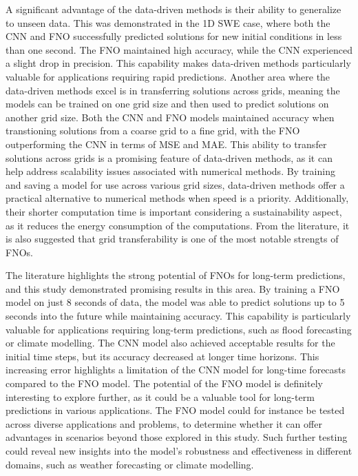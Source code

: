 A significant advantage of the data-driven methods is their ability to generalize to unseen data.
This was demonstrated in the 1D SWE case, where both the CNN and FNO successfully predicted solutions for new initial conditions in less than one second.
The FNO maintained high accuracy, while the CNN experienced a slight drop in precision.
This capability makes data-driven methods particularly valuable for applications requiring rapid predictions.
Another area where the data-driven methods excel is in transferring solutions across grids, meaning the models can be trained on one grid size and then used to predict solutions on another grid size.
Both the CNN and FNO models maintained accuracy when transtioning solutions from a coarse grid to a fine grid, with the FNO outperforming the CNN in terms of MSE and MAE.
This ability to transfer solutions across grids is a promising feature of data-driven methods, as it can help address scalability issues associated with numerical methods.
By training and saving a model for use across various grid sizes, data-driven methods offer a practical alternative to numerical methods when speed is a priority.
Additionally, their shorter computation time is important considering a sustainability aspect, as it reduces the energy consumption of the computations.
From the literature, it is also suggested that grid transferability is one of the most notable strengts of FNOs.

The literature highlights the strong potential of FNOs for long-term predictions, and this study demonstrated promising results in this area.
By training a FNO model on just 8 seconds of data, the model was able to predict solutions up to 5 seconds into the future while maintaining accuracy.
This capability is particularly valuable for applications requiring long-term predictions, such as flood forecasting or climate modelling.
The CNN model also achieved acceptable results for the initial time steps, but its accuracy decreased at longer time horizons.
This increasing error highlights a limitation of the CNN model for long-time forecasts compared to the FNO model.
The potential of the FNO model is definitely interesting to explore further, as it could be a valuable tool for long-term predictions in various applications.
The FNO model could for instance be tested across diverse applications and problems, to determine whether it can offer advantages in scenarios beyond those explored in this study.
Such further testing could reveal new insights into the model's robustness and effectiveness in different domains, such as weather forecasting or climate modelling.

